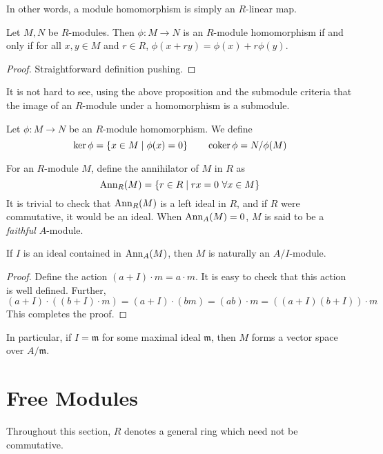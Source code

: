 In other words, a module homomorphism is simply an $R$-linear map. 

\begin{proposition}
    Let $M, N$ be $R$-modules. Then $\phi: M\to N$ is an $R$-module homomorphism if and only if for all $x,y\in M$ and $r\in R$, $\phi(x + ry) = \phi(x) + r\phi(y)$.
\end{proposition}
\begin{proof}
    Straightforward definition pushing.
\end{proof}

It is not hard to see, using the above proposition and the submodule criteria that the image of an $R$-module under a homomorphism is a submodule.


\begin{definition}
    Let $\phi:M\to N$ be an $R$-module homomorphism. We define 
    \begin{equation*}
        \ker\phi = \{x\in M\mid\phi(x) = 0\}\qquad\operatorname{coker}\phi = N/\phi(M)
    \end{equation*}
\end{definition}

For an $R$-module $M$, define the annihilator of $M$ in $R$ as 
\begin{equation*}
    \operatorname{Ann}_R(M) = \{r\in R\mid rx = 0~\forall x\in M\}
\end{equation*}
It is trivial to check that $\operatorname{Ann}_R(M)$ is a left ideal in $R$, and if $R$ were commutative, it would be an ideal. When $\operatorname{Ann}_A(M) = 0$, $M$ is said to be a \textit{faithful} $A$-module.

\begin{proposition}
    If $I$ is an ideal contained in $\operatorname{Ann}_A(M)$, then $M$ is naturally an $A/I$-module.
\end{proposition}
\begin{proof}
    Define the action $(a + I)\cdot m = a\cdot m$. It is easy to check that this action is well defined. Further, 
    \begin{equation*}
        (a + I)\cdot((b + I)\cdot m) = (a + I)\cdot(bm) = (ab)\cdot m = ((a + I)(b + I))\cdot m
    \end{equation*}
    This completes the proof.
\end{proof}

In particular, if $I = \mathfrak m$ for some maximal ideal $\mathfrak m$, then $M$ forms a vector space over $A/\mathfrak m$.

\section{Free Modules}
Throughout this section, $R$ denotes a general ring which need not be commutative.

